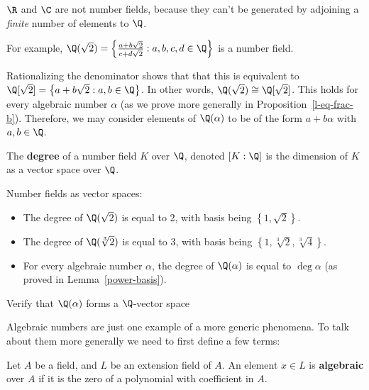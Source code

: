 \begin{rem}
$\R$ and $\C$ are not number fields, because they can't be generated by adjoining a \textit{finite} number of elements to $\Q$.
\end{rem}

\begin{ex}
For example, $\Q(\sqrt{2}) = \left\{\frac{a + b \sqrt{2}}{c + d \sqrt{2}} : a,b,c,d \in \Q\right\}$ is a number field.
\end{ex}

\noindent Rationalizing the denominator shows that that this is equivalent to $\Q[\sqrt{2}] = \left\{a + b \sqrt{2} : a,b \in \Q\right\}$. In other words, $\Q(\sqrt{2}) \cong \Q[\sqrt{2}]$. This holds for every algebraic number $\alpha$ (as we prove more generally in Proposition~\ref{l-eq-frac-b}). Therefore, we may consider elements of $\Q(\alpha)$ to be of the form $a + b\alpha$ with $a, b \in \Q$.

\begin{df}
The \textbf{degree} of a number field $K$ over $\Q$, denoted $[K:\Q]$ is the dimension of $K$ as a vector space over $\Q$.
\end{df}

\begin{ex} Number fields as vector spaces:
\begin{itemize}
\item The degree of $\Q(\sqrt{2})$ is equal to 2, with basis being $\left\{1, \sqrt{2}\right\}$.
\item The degree of $\Q(\sqrt[3]{2})$ is equal to 3, with basis being $\left\{1, \sqrt[3]{2}, \sqrt[3]{4}\right\}$.
\item For every algebraic number $\alpha$, the degree of $\Q(\alpha)$ is equal to $\deg \alpha$ (as proved in Lemma~\ref{power-basis}).
\end{itemize}
\end{ex}

\begin{exr}
Verify that $\Q(\alpha)$ forms a $\Q$-vector space
\end{exr}

\noindent Algebraic numbers are just one example of a more generic phenomena. To talk about them more generally we need to first define a few terms:

\begin{df}
Let $A$ be a field, and $L$ be an extension field of $A$. An element $x \in L$ is \textbf{algebraic} over $A$ if it is the zero of a polynomial with coefficient in $A$.
\end{df}

